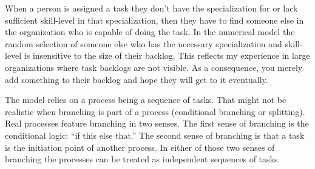 
When a person is assigned a task they don't have the specialization for or lack sufficient skill-level in that specialization, then they have to find someone else in the organization who is capable of doing the task. 
In the numerical model the random selection of someone else who has the necessary specialization and skill-level is insensitive to the size of their backlog. This reflects my experience in  large organizations where task backlogs are not visible. As a consequence, you merely add something to their backlog and hope they will get to it eventually.



The model relies on a process being a sequence of tasks. That might not be realistic when branching is part of a process (conditional branching or splitting).
Real processes feature branching in two senses. The first sense of branching is the conditional logic: ``if this else that.''
The second sense of branching is that a task is the initiation point of another process. 
In either of those two senses of branching the processes can be treated as independent sequences of tasks.



